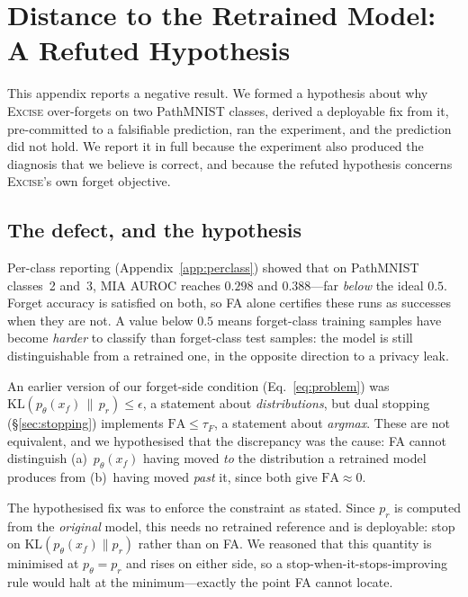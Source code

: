 \documentclass{article}
\newcommand{\ours}{\textsc{Excise}}
\newcommand{\KL}{\mathrm{KL}}
\newcommand{\rev}[1]{{\color{revisedB}#1}}
\theoremstyle{remark}
\theoremstyle{plain}
\begin{document}
\section{Distance to the Retrained Model: A Refuted Hypothesis}\label{app:d2r}

This appendix reports a negative result. We formed a hypothesis about why
\ours{} over-forgets on two PathMNIST classes, derived a deployable fix from it,
pre-committed to a falsifiable prediction, ran the experiment, and the
prediction did not hold. We report it in full because the experiment also
produced the diagnosis that we believe is correct, and because the refuted
hypothesis concerns \ours{}'s own forget objective.

\subsection{The defect, and the hypothesis}

Per-class reporting (Appendix~\ref{app:perclass}) showed that on PathMNIST
classes~2 and~3, MIA AUROC reaches $0.298$ and $0.388$---far \emph{below} the
ideal $0.5$. Forget accuracy is satisfied on both, so FA alone certifies these
runs as successes when they are not. A value below $0.5$ means forget-class
training samples have become \emph{harder} to classify than forget-class test
samples: the model is still distinguishable from a retrained one, in the
opposite direction to a privacy leak.

\rev{An earlier version of our forget-side condition (Eq.~\ref{eq:problem}) was
$\KL(p_\theta(x_f)\,\|\,p_r) \le \epsilon$}, a statement about
\emph{distributions}, but dual stopping (\S\ref{sec:stopping}) implements
\rev{$\mathrm{FA} \le \tau_F$}, a statement about \emph{argmax}. These are not
equivalent, and we hypothesised that the discrepancy was the cause: FA cannot
distinguish (a)~$p_\theta(x_f)$ having moved \emph{to} the distribution a
retrained model produces from (b)~having moved \emph{past} it, since both give
$\mathrm{FA}\approx 0$.

The hypothesised fix was to enforce the constraint as stated. Since $p_r$ is
computed from the \emph{original} model, this needs no retrained reference and
is deployable: stop on $\KL(p_\theta(x_f)\|p_r)$ rather than on FA. We reasoned
that this quantity is minimised at $p_\theta = p_r$ and rises on either side, so
a stop-when-it-stops-improving rule would halt at the minimum---exactly the
point FA cannot locate.
\end{document}
